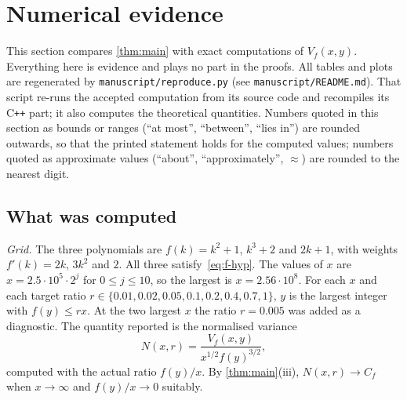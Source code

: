 \section{Numerical evidence}\label{sec:numerics}

This section compares \cref{thm:main} with exact computations of $V_f(x,y)$. Everything here is evidence and plays no part in the proofs. All tables and plots are regenerated by \nolinkurl{manuscript/reproduce.py} (see \nolinkurl{manuscript/README.md}). That script re-runs the accepted computation from its source code and recompiles its C\texttt{++} part; it also computes the theoretical quantities. Numbers quoted in this section as bounds or ranges (``at most'', ``between'', ``lies in'') are rounded outwards, so that the printed statement holds for the computed values; numbers quoted as approximate values (``about'', ``approximately'', $\approx$) are rounded to the nearest digit.

\subsection{What was computed}\label{sec:num-method}

\emph{Grid.} The three polynomials are $f(k)=k^2+1$, $k^3+2$ and $2k+1$, with weights $f'(k)=2k$, $3k^2$ and $2$. All three satisfy~\eqref{eq:f-hyp}. The values of $x$ are $x=2.5\cdot10^5\cdot2^j$ for $0\le j\le10$, so the largest is $x=2.56\cdot10^8$. For each $x$ and each target ratio $r\in\{0.01,0.02,0.05,0.1,0.2,0.4,0.7,1\}$, $y$ is the largest integer with $f(y)\le rx$. At the two largest $x$ the ratio $r=0.005$ was added as a diagnostic. The quantity reported is the normalised variance
\[
N(x,r)=\frac{V_f(x,y)}{x^{1/2}f(y)^{3/2}},
\]
computed with the actual ratio $f(y)/x$. By \cref{thm:main}(iii), $N(x,r)\to C_f$ when $x\to\infty$ and $f(y)/x\to0$ suitably.

